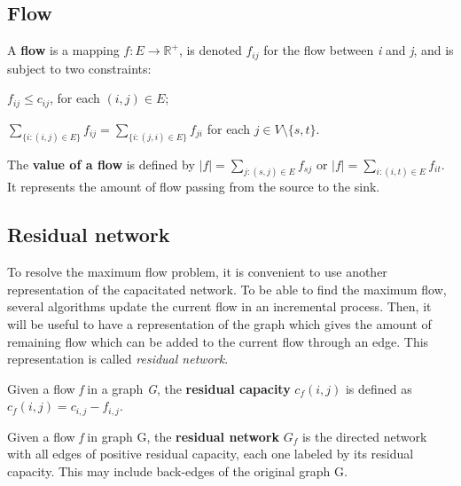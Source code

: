 \subsection{Flow}
\begin{definition}
\label{flow}
A \textbf{flow} is a mapping $f: E \to \mathbb{R}^{+}$, is denoted $f_{ij}$ for the flow between \textit{i} and \textit{j}, and is subject to two constraints:
\indent
\begin{description}
	\label{cap_constraint}
	\item[Capacity constraint] $f_{ij} \leq c_{ij}$, for each $(i, j) \in E$;
	\label{flow_constraint}
	\item[Flow conservation constraint] $\sum\limits_{\{i : (i,j) \in E\}} f_{ij} = \sum\limits_{\{i : (j,i) \in E\}} f_{ji}$ for each $j \in V \setminus \{s, t\}$.
\end{description}
\end{definition}

\begin{definition}
\label{vflow}
The \textbf{value of a flow} is defined by $\left\vert{f}\right\vert = \sum\limits_{j:(s,j) \in E} f_{sj}$ or $\left\vert{f}\right\vert = \sum\limits_{i:(i,t) \in E} f_{it}$. It represents the amount of flow passing from the source to the sink.
\end{definition}

\subsection{Residual network} 
To resolve the maximum flow problem, it is convenient to use another representation of the capacitated network. To be able to find the maximum flow, several algorithms update the current flow in an incremental process. Then, it will be useful to have a representation of the graph which gives the amount of remaining flow which can be added to the current flow through an edge. This representation is called \textit{residual network}.
\begin{definition}
\label{rcapacity}
Given a flow \textit{f} in a graph \textit{G}, the \textbf{residual capacity} $c_f (i,j)$ is defined as $c_f (i,j) = c_{i,j} - f_{i,j}$.
\end{definition}


\begin{definition}
\label{rnetwork}
Given a flow \textit{f} in graph G, the \textbf{residual network} $G_f$ is the directed network with all edges of positive residual capacity, each one labeled by its residual capacity. This may include back-edges of the original graph G.
\end{definition}

